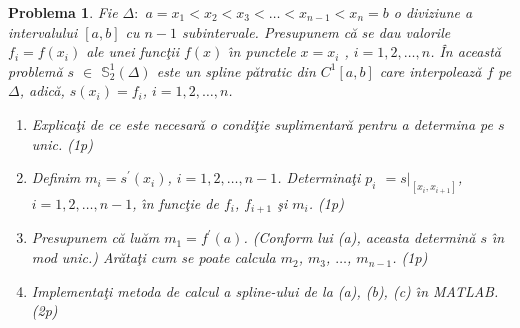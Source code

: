 \documentclass[12pt]{article}%
\newtheorem{problem}[theorem]{Problema}
\begin{document}
\begin{problem}
\label{Gautschip2.73}Fie $\Delta:$ $a=x_{1}<x_{2}<x_{3}<\dots<x_{n-1}<x_{n}=b$
o diviziune a intervalului $[a,b]$ cu $n-1$ subintervale. Presupunem c\u{a} se
dau valorile $f_{i}=f(x_{i})$ ale unei func\c{t}ii $f(x)$ \^{\i}n punctele
$x=x_{i}$ , $i=1,2,\dots,n$. \^{I}n aceast\u{a} problem\u{a} $s$ $\in$
$\mathbb{S}_{2}^{1}(\Delta)$ este un spline p\u{a}tratic din $C^{1}[a,b]$ care
interpoleaz\u{a} $f$ pe $\Delta$, adic\u{a}, $s(x_{i})=f_{i}$, $i=1,2,\dots,n$.

\begin{enumerate}
\item[(a)] Explica\c{t}i de ce este necesar\u{a} o condi\c{t}ie
suplimentar\u{a} pentru a determina pe $s$ unic. (1p)

\item[(b)] Definim $m_{i}=s^{\prime}(x_{i})$, $i=1,2,\dots,n-1$.
Determina\c{t}i $p_{i}$ $=\left.  s\right\vert _{[x_{i},x_{i+1}]}$,
$i=1,2,\dots,n-1$, \^{\i}n func\c{t}ie de $f_{i}$, $f_{i+1}$ \c{s}i $m_{i}$. (1p)

\item[(c)] Presupunem c\u{a} lu\u{a}m $m_{1}=f^{\prime}(a)$. (Conform lui (a),
aceasta determin\u{a} $s$ \^{\i}n mod unic.) Ar\u{a}ta\c{t}i cum se poate
calcula $m_{2}$, $m_{3}$, $\dots$, $m_{n-1}$. (1p)

\item[(d)] Implementa\c{t}i metoda de calcul a spline-ului de la (a), (b), (c)
\^{\i}n MATLAB. (2p)
\end{enumerate}
\end{problem}
\end{document}
